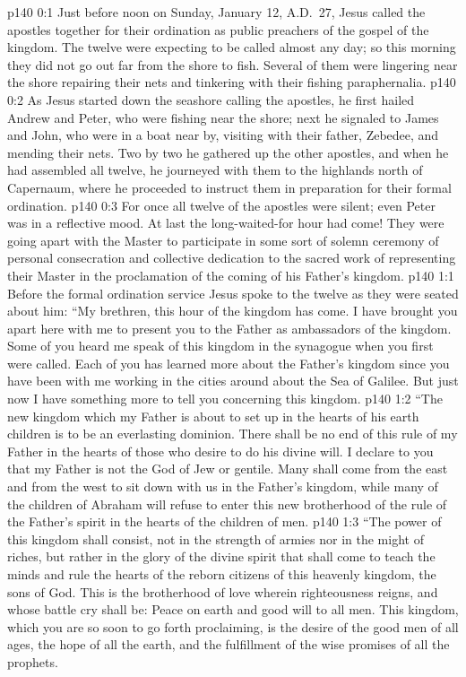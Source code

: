 \author{Midwayer Commission}
\vs p140 0:1 Just before noon on Sunday, January 12, A.D.~27, Jesus called the apostles together for their ordination as public preachers of the gospel of the kingdom. The twelve were expecting to be called almost any day; so this morning they did not go out far from the shore to fish. Several of them were lingering near the shore repairing their nets and tinkering with their fishing paraphernalia.\plusone
\vs p140 0:2 As Jesus started down the seashore calling the apostles, he first hailed Andrew and Peter, who were fishing near the shore; next he signaled to James and John, who were in a boat near by, visiting with their father, Zebedee, and mending their nets. Two by two he gathered up the other apostles, and when he had assembled all twelve, he journeyed with them to the highlands north of Capernaum, where he proceeded to instruct them in preparation for their formal ordination.
\vs p140 0:3 For once all twelve of the apostles were silent; even Peter was in a reflective mood. At last the long\hyp{}waited\hyp{}for hour had come! They were going apart with the Master to participate in some sort of solemn ceremony of personal consecration and collective dedication to the sacred work of representing their Master in the proclamation of the coming of his Father’s kingdom.
\vs p140 1:1 Before the formal ordination service Jesus spoke to the twelve as they were seated about him: \textcolor{ubdarkred}{“My brethren, this hour of the kingdom has come. I have brought you apart here with me to present you to the Father as ambassadors of the kingdom. Some of you heard me speak of this kingdom in the synagogue when you first were called. Each of you has learned more about the Father’s kingdom since you have been with me working in the cities around about the Sea of Galilee. But just now I have something more to tell you concerning this kingdom.}
\vs p140 1:2 \textcolor{ubdarkred}{“The new kingdom which my Father is about to set up in the hearts of his earth children is to be an everlasting dominion. There shall be no end of this rule of my Father in the hearts of those who desire to do his divine will. I declare to you that my Father is not the God of Jew or gentile. Many shall come from the east and from the west to sit down with us in the Father’s kingdom, while many of the children of Abraham will refuse to enter this new brotherhood of the rule of the Father’s spirit in the hearts of the children of men.}
\vs p140 1:3 \textcolor{ubdarkred}{“The power of this kingdom shall consist, not in the strength of armies nor in the might of riches, but rather in the glory of the divine spirit that shall come to teach the minds and rule the hearts of the reborn citizens of this heavenly kingdom, the sons of God. This is the brotherhood of love wherein righteousness reigns, and whose battle cry shall be: Peace on earth and good will to all men. This kingdom, which you are so soon to go forth proclaiming, is the desire of the good men of all ages, the hope of all the earth, and the fulfillment of the wise promises of all the prophets.}

